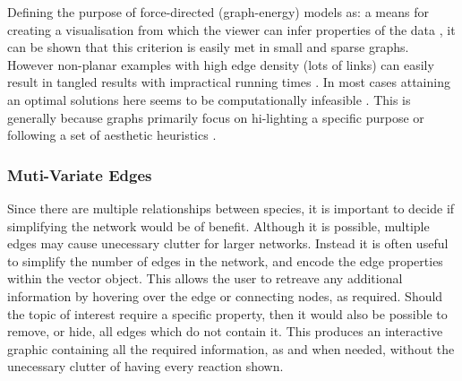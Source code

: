 Defining the purpose of force-directed (graph-energy) models as: a means for creating a visualisation from which the viewer can infer properties of the data \citep{noack}, it can be shown that this criterion is easily met in small and sparse graphs. However non-planar examples with high edge density (lots of links) can easily result in tangled results with impractical running times \citep{tvg}. In most cases attaining an optimal solutions here seems to be computationally infeasible \citep{nicelyanneal}. This is generally because graphs primarily focus on hi-lighting a specific purpose or following a set of aesthetic heuristics \citep{eyetrack}. 

\subsubsection{Muti-Variate Edges}
Since there are multiple relationships between species, it is important to decide if simplifying the network would be of benefit. Although it is possible, multiple edges may cause unecessary clutter for larger networks. Instead it is often useful to simplify the number of edges in the network, and encode the edge properties within the vector object. This allows the user to retreave any additional information by hovering over the edge or connecting nodes, as required. Should the topic of interest require a specific property, then it would also be possible to remove, or hide, all edges which do not contain it. This produces an interactive graphic containing all the required information, as and when needed, without the unecessary clutter of having every reaction shown. 
% 

% 





